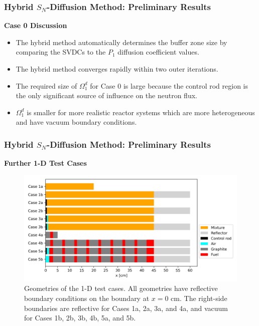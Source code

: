 \begin{frame}
  \frametitle{Hybrid $S_N$-Diffusion Method: Preliminary Results}
  \textbf{Case 0 Discussion}
  \begin{itemize}
    \item The hybrid method automatically determines the buffer zone size by comparing the SVDCs
      to the $P_1$ diffusion coefficient values.
    \item The hybrid method converges rapidly within two outer iterations.
    \item The required size of $\Omega^d_1$ for Case 0 is large because the control rod region is
      the only significant source of influence on the neutron flux.
    \item $\Omega^d_1$ is smaller for more realistic reactor systems which are more heterogeneous
      and have vacuum boundary conditions.
  \end{itemize}
\end{frame}

\begin{frame}
  \frametitle{Hybrid $S_N$-Diffusion Method: Preliminary Results}
  \textbf{Further 1-D Test Cases}
  \begin{figure}[htb!]
    \centering
    \includegraphics[width=\columnwidth]{../images/case-geometry}
    \caption{Geometries of the 1-D test cases. All geometries
      have reflective boundary conditions on the boundary at $x=0$ cm. The right-side boundaries are
      reflective for Cases 1a, 2a, 3a, and 4a, and vacuum for Cases 1b, 2b, 3b, 4b, 5a, and 5b.}
    \label{fig:case-geom}
  \end{figure}
\end{frame}

